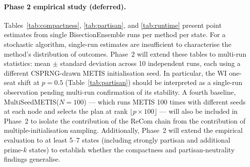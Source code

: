 \paragraph{Phase 2 empirical study (deferred).}
Tables~\ref{tab:compactness}, \ref{tab:partisan}, and \ref{tab:runtime} present
point estimates from single BisectionEnsemble runs per method per state.
For a stochastic algorithm, single-run estimates are insufficient to characterise
the method's distribution of outcomes. Phase~2 will extend these tables to
multi-run statistics: mean $\pm$ standard deviation across 10 independent runs,
each using a different CSPRNG-drawn METIS initialisation seed. In particular,
the WI one-seat shift at $p=0.5$ (Table~\ref{tab:partisan}) should be interpreted
as a single-run observation pending multi-run confirmation of its stability.
A fourth baseline, MultiSeedMETIS($N=100$) --- which runs METIS 100 times with
different seeds at each node and selects the plan at rank $\lfloor p \times 100
\rfloor$ --- will also be included in Phase~2 to isolate the contribution of
the ReCom chain from the contribution of multiple-initialisation sampling.
Additionally, Phase~2 will extend the empirical evaluation to at least 5--7
states (including strongly partisan and additional prime-$k$ states) to establish
whether the compactness and partisan-neutrality findings generalise.
